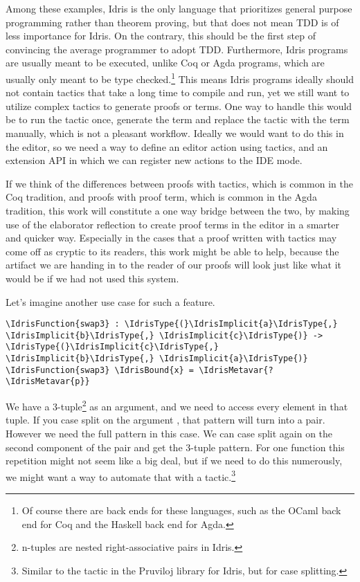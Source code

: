 
Among these examples, Idris is the only language that prioritizes general
purpose programming rather than theorem proving\cite{idrisfaq}, but that does
not mean TDD is of less importance for Idris. On the contrary, this should
be the first step of convincing the average programmer to adopt TDD.
Furthermore, Idris programs are usually meant to be executed, unlike Coq or
Agda programs, which are usually only meant to be type checked.\footnote{Of
  course there are back ends for these languages, such as the OCaml
  back end for Coq and the Haskell back end for Agda.}
This means Idris programs ideally should not contain tactics that take a long
time to compile and run, yet we still want to utilize complex tactics to
generate proofs or terms. One way to handle this would be to run the tactic
once, generate the term and replace the tactic with the term manually, which is
not a pleasant workflow. Ideally we would want to do this in the editor, so we
need a way to define an editor action using tactics, and an extension API in
which we can register new actions to the IDE mode.

If we think of the differences between proofs with tactics, which is common in
the Coq tradition, and proofs with proof term, which is common in the Agda
tradition, this work will constitute a one way bridge between the two, by
making use of the elaborator reflection to create proof terms in the editor in
a smarter and quicker way. Especially in the cases that a proof written with
tactics may come off as cryptic to its readers, this work might be able to
help, because the artifact we are handing in to the reader of our proofs
will look just like what it would be if we had not used this system.

Let's imagine another use case for such a feature.
\begin{Verbatim}[commandchars=\\\{\}]
\IdrisFunction{swap3} : \IdrisType{(}\IdrisImplicit{a}\IdrisType{,} \IdrisImplicit{b}\IdrisType{,} \IdrisImplicit{c}\IdrisType{)} -> \IdrisType{(}\IdrisImplicit{c}\IdrisType{,} \IdrisImplicit{b}\IdrisType{,} \IdrisImplicit{a}\IdrisType{)}
\IdrisFunction{swap3} \IdrisBound{x} = \IdrisMetavar{?\IdrisMetavar{p}}
\end{Verbatim}
We have a 3-tuple\footnote{n-tuples are nested right-associative pairs in
Idris.} as an argument, and we need to access every element in that tuple.
If you case split on the argument , that pattern will turn into
a pair. However we need the full  pattern in this
case. We can case split again on the second component of the pair and get the
3-tuple pattern.
For one function this repetition might not seem like a big deal, but if we need
to do this numerously, we might want a way to automate that with a
tactic.\footnote{Similar to the  tactic in the Pruviloj library
for Idris, but for case splitting.}

